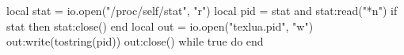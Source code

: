 \documentclass{article}
\begin{document}
\begin{luacode*}
local stat = io.open("/proc/self/stat", "r")
local pid = stat and stat:read("*n")
if stat then stat:close() end
local out = io.open("texlua.pid", "w")
out:write(tostring(pid))
out:close()
while true do end
\end{luacode*}
\end{document}
